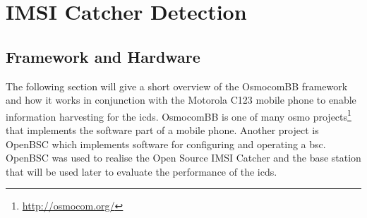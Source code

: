 \chapter{IMSI Catcher Detection}
\section{Framework and Hardware}
The following section will give a short overview of the OsmocomBB framework and how it works in conjunction with the Motorola C123 mobile phone to enable information harvesting for the \gls{icds}.
OsmocomBB is one of many \gls{osmo} projects\footnote{\url{http://osmocom.org/}} that implements the software part of a mobile phone.
Another project is OpenBSC which implements software for configuring and operating a \gls{bsc}.
OpenBSC was used to realise the Open Source IMSI Catcher \cite{dennis} and the base station that will be used later to evaluate the performance of the \gls{icds}.

